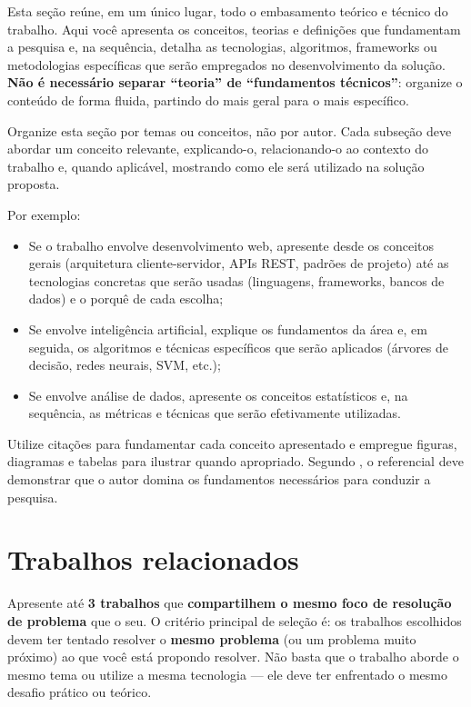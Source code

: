 \documentclass[
    12pt,                %
    openright,           %
    oneside,             %
    a4paper,             %
    english,             %
    brazil               %
]{abntex2}
\begin{document}
Esta seção reúne, em um único lugar, todo o embasamento teórico e técnico do trabalho. Aqui você apresenta os conceitos, teorias e definições que fundamentam a pesquisa e, na sequência, detalha as tecnologias, algoritmos, frameworks ou metodologias específicas que serão empregados no desenvolvimento da solução. \textbf{Não é necessário separar ``teoria'' de ``fundamentos técnicos''}: organize o conteúdo de forma fluida, partindo do mais geral para o mais específico.

Organize esta seção por temas ou conceitos, não por autor. Cada subseção deve abordar um conceito relevante, explicando-o, relacionando-o ao contexto do trabalho e, quando aplicável, mostrando como ele será utilizado na solução proposta.

Por exemplo:
\begin{itemize}
    \item Se o trabalho envolve desenvolvimento web, apresente desde os conceitos gerais (arquitetura cliente-servidor, APIs REST, padrões de projeto) até as tecnologias concretas que serão usadas (linguagens, frameworks, bancos de dados) e o porquê de cada escolha;
    \item Se envolve inteligência artificial, explique os fundamentos da área e, em seguida, os algoritmos e técnicas específicos que serão aplicados (árvores de decisão, redes neurais, SVM, etc.);
    \item Se envolve análise de dados, apresente os conceitos estatísticos e, na sequência, as métricas e técnicas que serão efetivamente utilizadas.
\end{itemize}

Utilize citações para fundamentar cada conceito apresentado e empregue figuras, diagramas e tabelas para ilustrar quando apropriado. Segundo , o referencial deve demonstrar que o autor domina os fundamentos necessários para conduzir a pesquisa.

\section{Trabalhos relacionados}
\label{sec:trabalhos_relacionados}

Apresente até \textbf{3 trabalhos} que \textbf{compartilhem o mesmo foco de resolução de problema} que o seu. O critério principal de seleção é: os trabalhos escolhidos devem ter tentado resolver o \textbf{mesmo problema} (ou um problema muito próximo) ao que você está propondo resolver. Não basta que o trabalho aborde o mesmo tema ou utilize a mesma tecnologia --- ele deve ter enfrentado o mesmo desafio prático ou teórico.
\end{document}
